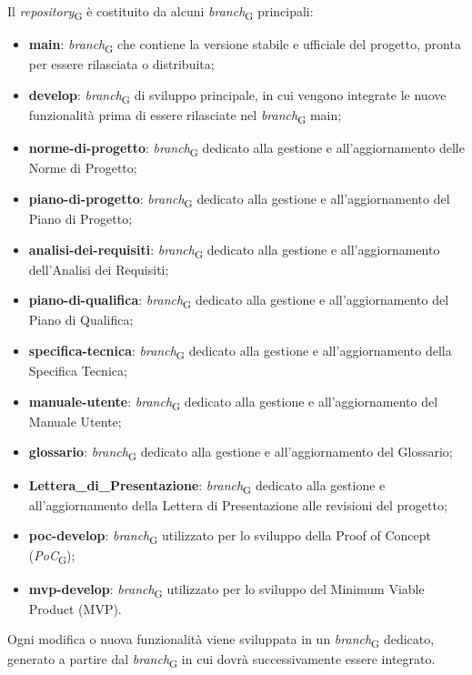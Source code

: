 Il \textit{repository}\textsubscript{G} è costituito da alcuni \textit{branch}\textsubscript{G} principali:
\begin{itemize}
    \item \textbf{main}: \textit{branch}\textsubscript{G} che contiene la versione stabile e ufficiale del progetto, pronta per essere rilasciata o distribuita;
    \item \textbf{develop}: \textit{branch}\textsubscript{G} di sviluppo principale, in cui vengono integrate le nuove funzionalità prima di essere rilasciate nel \textit{branch}\textsubscript{G} main;
    \item \textbf{norme-di-progetto}: \textit{branch}\textsubscript{G} dedicato alla gestione e all'aggiornamento delle Norme di Progetto;
    \item \textbf{piano-di-progetto}: \textit{branch}\textsubscript{G} dedicato alla gestione e all'aggiornamento del Piano di Progetto;
    \item \textbf{analisi-dei-requisiti}: \textit{branch}\textsubscript{G} dedicato alla gestione e all'aggiornamento dell'Analisi dei Requisiti;
    \item \textbf{piano-di-qualifica}: \textit{branch}\textsubscript{G} dedicato alla gestione e all'aggiornamento del Piano di Qualifica;
    \item \textbf{specifica-tecnica}: \textit{branch}\textsubscript{G} dedicato alla gestione e all'aggiornamento della Specifica Tecnica;
    \item \textbf{manuale-utente}: \textit{branch}\textsubscript{G} dedicato alla gestione e all'aggiornamento del Manuale Utente;
    \item \textbf{glossario}: \textit{branch}\textsubscript{G} dedicato alla gestione e all'aggiornamento del Glossario;
    \item \textbf{Lettera\_di\_Presentazione}: \textit{branch}\textsubscript{G} dedicato alla gestione e all'aggiornamento della Lettera di Presentazione alle revisioni del progetto;
    \item \textbf{poc-develop}: \textit{branch}\textsubscript{G} utilizzato per lo sviluppo della Proof of Concept (\textit{PoC}\textsubscript{G});
    \item \textbf{mvp-develop}: \textit{branch}\textsubscript{G} utilizzato per lo sviluppo del Minimum Viable Product (MVP).
\end{itemize}
Ogni modifica o nuova funzionalità viene sviluppata in un \textit{branch}\textsubscript{G} dedicato, generato a partire dal \textit{branch}\textsubscript{G} in cui dovrà successivamente essere integrato.

